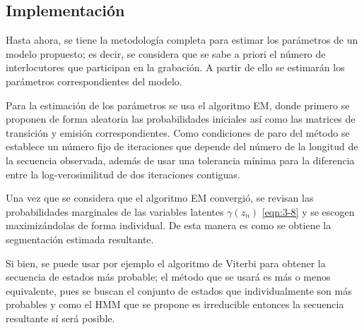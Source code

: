 \subsection{Implementación}

Hasta ahora, se tiene la metodología completa para estimar los parámetros de un modelo propuesto; es decir, se considera que se sabe a priori el número de interlocutores que participan en la grabación. A partir de ello se estimarán los parámetros correspondientes del modelo.

Para la estimación de los parámetros se usa el algoritmo \ac{EM}, donde primero se proponen de forma aleatoria las probabilidades iniciales así como las matrices de transición y emisión correspondientes. Como condiciones de paro del método se establece un número fijo de iteraciones que depende del número de la longitud de la secuencia observada, además de usar una tolerancia mínima para la diferencia entre la log-verosimilitud de dos iteraciones contiguas. 

Una vez que se considera que el algoritmo \ac{EM} convergió, se revisan las probabilidades marginales de las variables latentes $\gamma(z_n)$ \eqref{eqn:3-8} y se escogen maximizándolas de forma individual. De esta manera es como se obtiene la segmentación estimada resultante. 

Si bien, se puede usar por ejemplo el algoritmo de Viterbi para obtener la secuencia de estados más probable; el método que se usará es más o menos equivalente, pues se buscan el conjunto de estados que individualmente son más probables y como el \ac{HMM} que se propone es irreducible entonces la secuencia resultante sí será posible.
